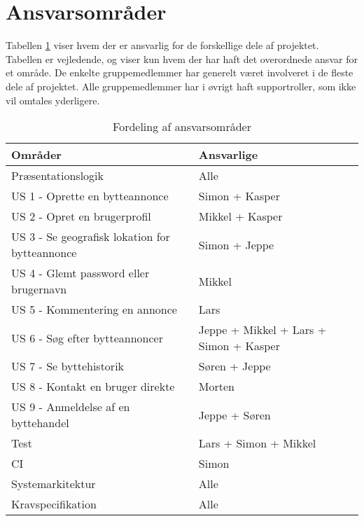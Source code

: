 \section{Ansvarsområder}
Tabellen \ref{fig:Ansvarstabel} viser hvem der er ansvarlig for de forskellige dele af projektet. Tabellen er vejledende, og viser kun hvem der har haft det overordnede ansvar for et område. De enkelte gruppemedlemmer har generelt været involveret i de fleste dele af projektet. Alle gruppemedlemmer har i øvrigt haft supportroller, som ikke vil omtales yderligere.  
\begin{table}[H]
	\begin{tabular}{ | l | p{5cm} |}
		\hline
		\textbf{Områder}  & \textbf{Ansvarlige} \\ \hline
		Præsentationslogik & Alle \\ \hline
		US 1 - Oprette en bytteannonce & Simon + Kasper \\ \hline
		US 2 - Opret en brugerprofil & Mikkel + Kasper \\ \hline
		US 3 - Se geografisk lokation for bytteannonce & Simon + Jeppe \\ \hline
		US 4 - Glemt password eller brugernavn & Mikkel \\ \hline
		US 5 - Kommentering en annonce & Lars \\ \hline
		US 6 - Søg efter bytteannoncer & Jeppe + Mikkel + Lars + Simon + Kasper \\ \hline
		US 7 - Se byttehistorik & Søren + Jeppe \\ \hline	
		US 8 - Kontakt en bruger direkte & Morten\\ \hline	
		US 9 - Anmeldelse af en byttehandel & Jeppe + Søren\\ \hline	
		Test & Lars + Simon + Mikkel  \\ \hline
		CI & Simon \\ \hline
		Systemarkitektur & Alle \\ \hline	
		Kravspecifikation & Alle \\ \hline	
	\end{tabular}
	\caption{Fordeling af ansvarsområder}
	\label{fig:Ansvarstabel}
\end{table}